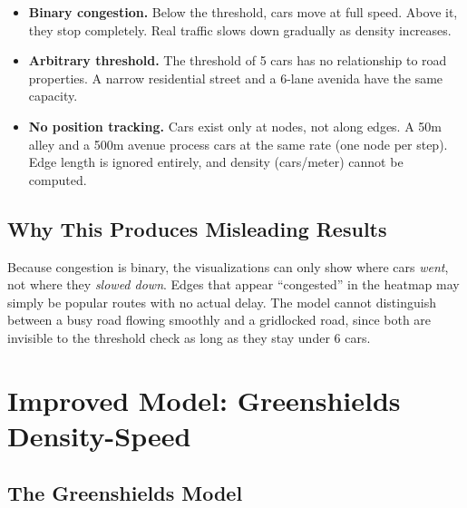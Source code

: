 \documentclass[12pt]{article}
\begin{document}
\begin{itemize}
    \item \textbf{Binary congestion.} Below the threshold, cars move at full speed. Above it, they stop completely. Real traffic slows down gradually as density increases.
    \item \textbf{Arbitrary threshold.} The threshold of 5 cars has no relationship to road properties. A narrow residential street and a 6-lane avenida have the same capacity.
    \item \textbf{No position tracking.} Cars exist only at nodes, not along edges. A 50m alley and a 500m avenue process cars at the same rate (one node per step). Edge length is ignored entirely, and density (cars/meter) cannot be computed.
\end{itemize}

\subsection{Why This Produces Misleading Results}

Because congestion is binary, the visualizations can only show where cars \textit{went}, not where they \textit{slowed down}. Edges that appear ``congested'' in the heatmap may simply be popular routes with no actual delay. The model cannot distinguish between a busy road flowing smoothly and a gridlocked road, since both are invisible to the threshold check as long as they stay under 6 cars.


\section{Improved Model: Greenshields Density-Speed}

\subsection{The Greenshields Model}
\end{document}

